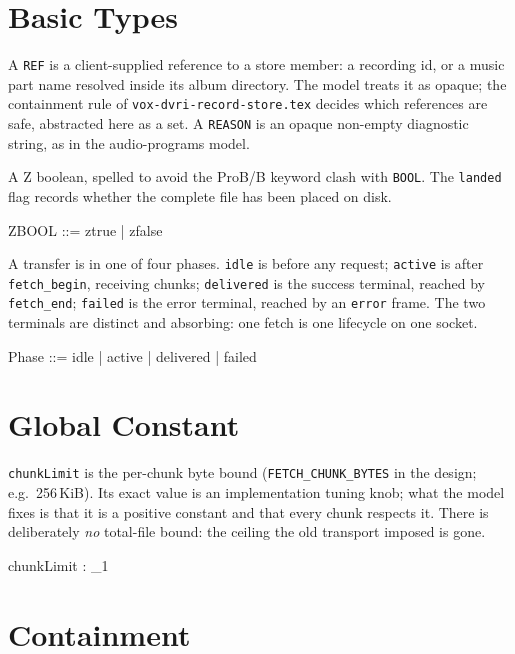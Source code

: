 \documentclass[a4paper,10pt,fleqn]{article}
\begin{document}
\section{Basic Types}

A \texttt{REF} is a client-supplied reference to a store member: a recording id,
or a music part name resolved inside its album directory. The model treats it as
opaque; the containment rule of \texttt{vox-dvri-record-store.tex} decides which
references are safe, abstracted here as a set. A \texttt{REASON} is an opaque
non-empty diagnostic string, as in the audio-programs model.

\begin{zed}
\end{zed}

A Z boolean, spelled to avoid the ProB/B keyword clash with \texttt{BOOL}. The
\texttt{landed} flag records whether the complete file has been placed on disk.

\begin{zed}
  ZBOOL ::= ztrue | zfalse
\end{zed}

A transfer is in one of four phases. \texttt{idle} is before any request;
\texttt{active} is after \texttt{fetch\_begin}, receiving chunks;
\texttt{delivered} is the success terminal, reached by \texttt{fetch\_end};
\texttt{failed} is the error terminal, reached by an \texttt{error} frame. The
two terminals are distinct and absorbing: one fetch is one lifecycle on one
socket.

\begin{zed}
  Phase ::= idle | active | delivered | failed
\end{zed}

\section{Global Constant}

\texttt{chunkLimit} is the per-chunk byte bound (\texttt{FETCH\_CHUNK\_BYTES} in
the design; e.g.\ 256\,KiB). Its exact value is an implementation tuning knob;
what the model fixes is that it is a positive constant and that every chunk
respects it. There is deliberately \emph{no} total-file bound: the ceiling the
old transport imposed is gone.

\begin{axdef}
  chunkLimit : \nat_1
\end{axdef}

\section{Containment}
\end{document}
